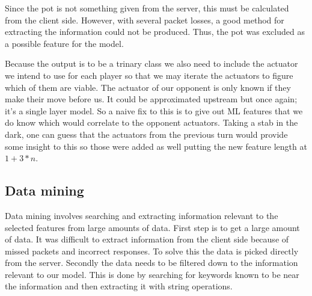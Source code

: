 \documentclass[../main.tex]{subfiles}
\begin{document}
Since the pot is not something given from the server, this must be calculated from the client side. However, with several packet losses, a good method for extracting the information could not be produced. Thus, the pot was excluded as a possible feature for the model.

Because the output is to be a trinary class we also need to include the actuator we intend to use for each player so that we may iterate the actuators to figure which of them are viable. The actuator of our opponent is only known if they make their move before us. It could be approximated upstream but once again; it's a single layer model. So a naive fix to this is to give out ML features that we do know which would correlate to the opponent actuators. Taking a stab in the dark, one can guess that the actuators from the previous turn would provide some insight to this so those were added as well putting the new feature length at $1+3*n$. 

\subsection{Data mining}
Data mining involves searching and extracting information relevant to the selected features from large amounts of data. First step is to get a large amount of data. It was difficult to extract information from the client side because of missed packets and incorrect responses. To solve this the data is picked directly from the server. Secondly the data needs to be  filtered down to the information relevant to our model. This is done by searching for keywords known to be near the information and then extracting it with string operations.
\end{document}
